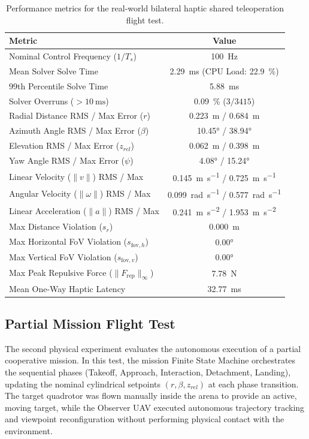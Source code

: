 \begin{table}[htbp]
\centering
\small
\caption{Performance metrics for the real-world bilateral haptic shared teleoperation flight test.}
\label{tab:hw_haptic_metrics}
\begin{tabular}{lc}
\toprule
\textbf{Metric} & \textbf{Value} \\
\midrule
Nominal Control Frequency ($1/T_s$) & \SI{100}{\hertz} \\
Mean Solver Solve Time & \SI{2.29}{\milli\second} (CPU Load: \SI{22.9}{\percent}) \\
99th Percentile Solve Time & \SI{5.88}{\milli\second} \\
Solver Overruns ($> \SI{10}{\milli\second}$) & \SI{0.09}{\percent} ($3 / 3415$) \\
\midrule
Radial Distance RMS / Max Error ($r$) & \SI{0.223}{\meter} / \SI{0.684}{\meter} \\
Azimuth Angle RMS / Max Error ($\beta$) & \ang{10.45} / \ang{38.94} \\
Elevation RMS / Max Error ($z_{rel}$) & \SI{0.062}{\meter} / \SI{0.398}{\meter} \\
Yaw Angle RMS / Max Error ($\psi$) & \ang{4.08} / \ang{15.24} \\
\midrule
Linear Velocity ($\|v\|$) RMS / Max & \SI{0.145}{\meter\per\second} / \SI{0.725}{\meter\per\second} \\
Angular Velocity ($\|\omega\|$) RMS / Max & \SI{0.099}{\radian\per\second} / \SI{0.577}{\radian\per\second} \\
Linear Acceleration ($\|a\|$) RMS / Max & \SI{0.241}{\meter\per\second\squared} / \SI{1.953}{\meter\per\second\squared} \\
\midrule
Max Distance Violation ($s_r$) & \SI{0.000}{\meter} \\
Max Horizontal FoV Violation ($s_{\text{fov},h}$) & \ang{0.00} \\
Max Vertical FoV Violation ($s_{\text{fov},v}$) & \ang{0.00} \\
Max Peak Repulsive Force ($\|F_{\text{rep}}\|_{\infty}$) & \SI{7.78}{\newton} \\
Mean One-Way Haptic Latency & \SI{32.77}{\milli\second} \\
\bottomrule
\end{tabular}
\end{table}

\subsection{Partial Mission Flight Test}
The second physical experiment evaluates the autonomous execution of a partial cooperative mission. In this test, the mission Finite State Machine orchestrates the sequential phases (Takeoff, Approach, Interaction, Detachment, Landing), updating the nominal cylindrical setpoints $(r, \beta, z_{rel})$ at each phase transition. The target quadrotor was flown manually inside the arena to provide an active, moving target, while the Observer UAV executed autonomous trajectory tracking and viewpoint reconfiguration without performing physical contact with the environment.

